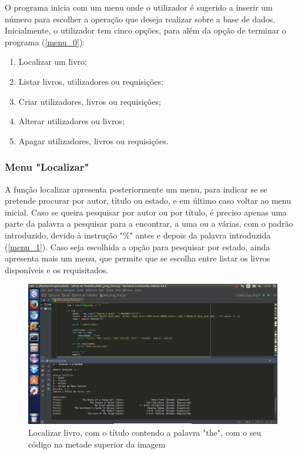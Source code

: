 \documentclass[11pt,openany,twoside]{report}
\begin{document}
O programa inicia com um menu onde o utilizador é sugerido a inserir um número para escolher a operação que deseja realizar sobre a base de dados. Inicialmente, o utilizador tem cinco opções, para além da opção de terminar o programa (\autoref{menu_0}): 
\begin{enumerate}
\item Localizar um livro;
\item Listar livros, utilizadores ou requisições;
\item Criar utilizadores, livros ou requisições;
\item Alterar utilizadores ou livros;
\item Apagar utilizadores, livros ou requisições.
\end{enumerate}

\subsubsection{Menu "Localizar"}

A função localizar apresenta posteriormente um menu, para indicar se se pretende procurar por autor, título ou estado, e em último caso voltar ao menu inicial. Caso se queira pesquisar por autor ou por título, é preciso apenas uma parte da palavra a pesquisar para a encontrar, a uma ou a várias, com o padrão introduzido, devido à instrução "\%" antes e depois da palavra introduzida (\autoref{menu_1}). Caso seja escolhida a opção para pesquisar por estado, ainda apresenta mais um menu, que permite que se escolha entre listar os livros disponíveis e os requisitados.

\begin{figure}
 \center
 \includegraphics[scale=.35]{menu_1.png}
 \caption{Localizar livro, com o título contendo a palavra "the", com o seu código na metade superior da imagem}
 \label{menu_1}
\end{figure}
\end{document}

